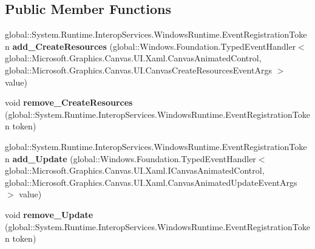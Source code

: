 \subsection*{Public Member Functions}
\begin{DoxyCompactItemize}
\item 
\mbox{\label{class_microsoft_1_1_graphics_1_1_canvas_1_1_u_i_1_1_xaml_1_1_canvas_animated_control_a625047d0ad176bc76c1686e025f4ee53}} 
global\+::\+System.\+Runtime.\+Interop\+Services.\+Windows\+Runtime.\+Event\+Registration\+Token {\bfseries add\+\_\+\+Create\+Resources} (global\+::\+Windows.\+Foundation.\+Typed\+Event\+Handler$<$ global\+::\+Microsoft.\+Graphics.\+Canvas.\+U\+I.\+Xaml.\+Canvas\+Animated\+Control, global\+::\+Microsoft.\+Graphics.\+Canvas.\+U\+I.\+Canvas\+Create\+Resources\+Event\+Args $>$ value)
\item 
\mbox{\label{class_microsoft_1_1_graphics_1_1_canvas_1_1_u_i_1_1_xaml_1_1_canvas_animated_control_a44a43d134b2c41ea2ec6eddf26aadd31}} 
void {\bfseries remove\+\_\+\+Create\+Resources} (global\+::\+System.\+Runtime.\+Interop\+Services.\+Windows\+Runtime.\+Event\+Registration\+Token token)
\item 
\mbox{\label{class_microsoft_1_1_graphics_1_1_canvas_1_1_u_i_1_1_xaml_1_1_canvas_animated_control_aa7a0e408eb82cfc307935e5bb671c4b8}} 
global\+::\+System.\+Runtime.\+Interop\+Services.\+Windows\+Runtime.\+Event\+Registration\+Token {\bfseries add\+\_\+\+Update} (global\+::\+Windows.\+Foundation.\+Typed\+Event\+Handler$<$ global\+::\+Microsoft.\+Graphics.\+Canvas.\+U\+I.\+Xaml.\+I\+Canvas\+Animated\+Control, global\+::\+Microsoft.\+Graphics.\+Canvas.\+U\+I.\+Xaml.\+Canvas\+Animated\+Update\+Event\+Args $>$ value)
\item 
\mbox{\label{class_microsoft_1_1_graphics_1_1_canvas_1_1_u_i_1_1_xaml_1_1_canvas_animated_control_a16a7c17d34f9282e536a02fcb511bb4e}} 
void {\bfseries remove\+\_\+\+Update} (global\+::\+System.\+Runtime.\+Interop\+Services.\+Windows\+Runtime.\+Event\+Registration\+Token token)
\item 

\end{DoxyCompactItemize}
